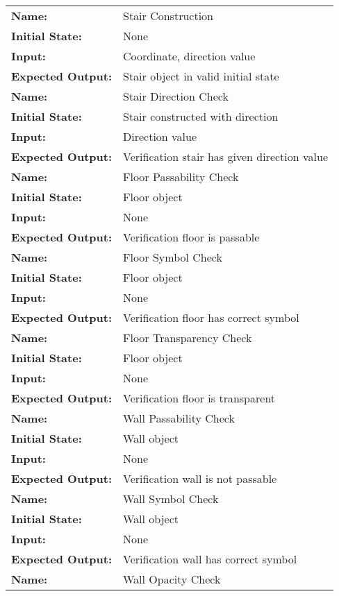 \documentclass[12pt, titlepage]{article}
\begin{document}
\begin{center}
\begin{longtable}{ l | p{10cm} }
				\hline
				\textbf{Name:} & Stair Construction\\
				\textbf{Initial State:} & None\\
				\textbf{Input:} & Coordinate, direction value\\
				\textbf{Expected Output:} & Stair object in valid initial state\\
				\hline
				\textbf{Name:} & Stair Direction Check\\
				\textbf{Initial State:} & Stair constructed with direction\\
				\textbf{Input:} & Direction value\\
				\textbf{Expected Output:} & Verification stair has given direction value\\
				\hline
				\textbf{Name:} & Floor Passability Check\\
				\textbf{Initial State:} & Floor object\\
				\textbf{Input:} & None\\
				\textbf{Expected Output:} & Verification floor is passable\\
				\hline
				\textbf{Name:} & Floor Symbol Check\\
				\textbf{Initial State:} & Floor object\\
				\textbf{Input:} & None\\
				\textbf{Expected Output:} & Verification floor has correct symbol\\
				\hline
				\textbf{Name:} & Floor Transparency Check\\
				\textbf{Initial State:} & Floor object\\
				\textbf{Input:} & None\\
				\textbf{Expected Output:} & Verification floor is transparent\\
				\hline
				\textbf{Name:} & Wall Passability Check\\
				\textbf{Initial State:} & Wall object\\
				\textbf{Input:} & None\\
				\textbf{Expected Output:} & Verification wall is not passable\\
				\hline
				\textbf{Name:} & Wall Symbol Check\\
				\textbf{Initial State:} & Wall object\\
				\textbf{Input:} & None\\
				\textbf{Expected Output:} & Verification wall has correct symbol\\
				\hline
				\textbf{Name:} & Wall Opacity Check\\

\end{longtable}
\end{center}
\end{document}
